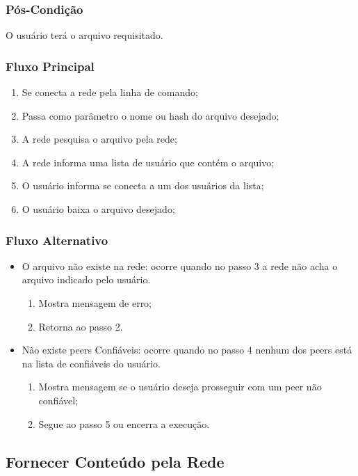 \subsubsection{Pós-Condição}
O usuário terá o arquivo requisitado.
\subsubsection{Fluxo Principal}
\begin{enumerate}
    \item Se conecta a rede pela linha de comando;
    \item Passa como parâmetro o nome ou hash do arquivo desejado;
    \item A rede pesquisa o arquivo pela rede;
    \item A rede informa uma lista de usuário que contém o arquivo;
    \item O usuário informa se conecta a um dos usuários da lista;
    \item O usuário baixa o arquivo desejado;
\end{enumerate}
\subsubsection{Fluxo Alternativo}
\begin{itemize}
    \item O arquivo não existe na rede: ocorre quando no passo 3 a rede não acha o arquivo indicado pelo usuário.
    \begin{enumerate}
        \item Mostra mensagem de erro;
        \item Retorna ao passo 2.
    \end{enumerate}
    \item Não existe peers Confiáveis: ocorre quando no passo 4 nenhum dos peers está na lista de confiáveis do usuário.
    \begin{enumerate}
        \item Mostra mensagem se o usuário deseja prosseguir com um peer não confiável;
        \item Segue ao passo 5 ou encerra a execução.
    \end{enumerate}
\end{itemize}


\subsection{Fornecer Conteúdo pela Rede}

